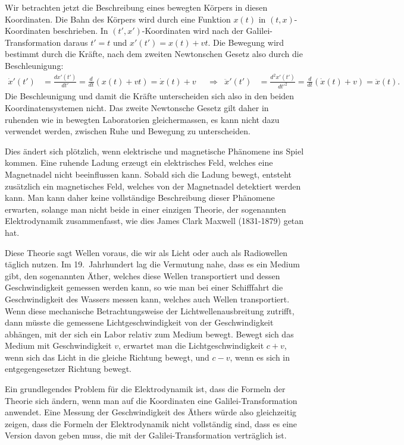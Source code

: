 Wir betrachten jetzt die Beschreibung eines bewegten Körpers in diesen
Koordinaten.
Die Bahn des Körpers wird durch eine Funktion $x(t)$ in $(t,x)$-Koordinaten
beschrieben.
In $(t',x')$-Koordinaten wird nach der Galilei-Transformation daraus
$t'=t$ und $x'(t')=x(t)+vt$.
%
%
Die Bewegung wird bestimmt durch die Kräfte, nach dem zweiten Newtonschen
Gesetz also durch die Beschleunigung:
\begin{align}
\dot x'(t')
&=
\frac{dx'(t')}{dt'}
=
\frac{d}{dt}(x(t)+vt)
=
\dot x(t) + v
&&\Rightarrow&
\ddot x'(t')
&=
\frac{d^2x'(t')}{dt'^2}
=
\frac{d}{dt} (\dot x(t) + v)
=
\ddot x(t).
\end{align}
Die Beschleunigung und damit die Kräfte unterscheiden sich also in den
beiden Koordinatensystemen nicht.
Das zweite Newtonsche Gesetz gilt daher in ruhenden wie in bewegten
Laboratorien gleichermassen, es kann nicht dazu verwendet werden, zwischen
Ruhe und Bewegung zu unterscheiden.

Dies ändert sich plötzlich, wenn elektrische und magnetische Phänomene
ins Spiel kommen.
Eine ruhende Ladung erzeugt ein elektrisches Feld, welches eine Magnetnadel
nicht beeinflussen kann.
Sobald sich die Ladung bewegt, entsteht zusätzlich ein magnetisches Feld,
welches von der Magnetnadel detektiert werden kann.
Man kann daher keine voll\-ständige Beschreibung dieser Phänomene erwarten,
solange man nicht beide in einer einzigen Theorie, der sogenannten
Elektrodynamik zusammenfasst, wie dies James Clark Maxwell (1831-1879)
getan hat.
%
%

Diese Theorie sagt Wellen voraus, die wir als Licht oder auch als Radiowellen
täglich nutzen.
Im 19.~Jahrhundert lag die Vermutung nahe, dass es ein Medium gibt,
den sogenannten Äther, welches
diese Wellen transportiert und dessen Geschwindigkeit gemessen werden
kann, so wie man bei einer Schifffahrt die Geschwindigkeit des Wassers
messen kann, welches auch Wellen transportiert.
%
Wenn diese mechanische Betrachtungsweise der Lichtwellenausbreitung
zutrifft, dann müsste die gemessene Lichtgeschwindigkeit von der
Geschwindigkeit abhängen, mit der sich ein Labor relativ zum Medium
bewegt.
Bewegt sich das Medium mit Geschwindigkeit $v$, erwartet man die
Lichtgeschwindigkeit $c+v$, wenn sich das Licht in die gleiche Richtung
bewegt, und $c-v$, wenn es sich in entgegengesetzer Richtung bewegt.

Ein grundlegendes Problem für die Elektrodynamik ist, dass die
Formeln der Theorie sich ändern, wenn man auf die Koordinaten eine
Galilei-Transformation anwendet.
Eine Messung der Geschwindigkeit des Äthers würde also gleichzeitig
zeigen, dass die Formeln der Elektrodynamik nicht voll\-ständig sind,
dass es eine Version davon geben muss, die mit der Galilei-Transformation
verträglich ist.

